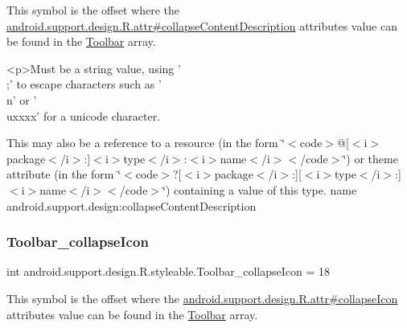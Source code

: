 This symbol is the offset where the \hyperlink{classandroid_1_1support_1_1design_1_1R_1_1attr_aa5754fb1f9395624cc050bbc138cd96d}{android.\+support.\+design.\+R.\+attr\#collapse\+Content\+Description} attribute\textquotesingle{}s value can be found in the \hyperlink{classandroid_1_1support_1_1design_1_1R_1_1styleable_a7783ebe780dbe2a845802a40519a46e9}{Toolbar} array.

\begin{DoxyVerb}      <p>Must be a string value, using '\\;' to escape characters such as '\\n' or '\\uxxxx' for a unicode character.
\end{DoxyVerb}
 

This may also be a reference to a resource (in the form \char`\"{}$<$code$>$@\mbox{[}$<$i$>$package$<$/i$>$\+:\mbox{]}$<$i$>$type$<$/i$>$\+:$<$i$>$name$<$/i$>$$<$/code$>$\char`\"{}) or theme attribute (in the form \char`\"{}$<$code$>$?\mbox{[}$<$i$>$package$<$/i$>$\+:\mbox{]}\mbox{[}$<$i$>$type$<$/i$>$\+:\mbox{]}$<$i$>$name$<$/i$>$$<$/code$>$\char`\"{}) containing a value of this type.  name android.\+support.\+design\+:collapse\+Content\+Description \mbox{\label{classandroid_1_1support_1_1design_1_1R_1_1styleable_ab8736925c114eaeba368273e6f851ae8}} 
\subsubsection{\texorpdfstring{Toolbar\+\_\+collapse\+Icon}{Toolbar\_collapseIcon}}
{\footnotesize\ttfamily int android.\+support.\+design.\+R.\+styleable.\+Toolbar\+\_\+collapse\+Icon = 18\hspace{0.3cm}{\ttfamily [static]}}

This symbol is the offset where the \hyperlink{classandroid_1_1support_1_1design_1_1R_1_1attr_ab780800888c8f742b7139b48235b7ff7}{android.\+support.\+design.\+R.\+attr\#collapse\+Icon} attribute\textquotesingle{}s value can be found in the \hyperlink{classandroid_1_1support_1_1design_1_1R_1_1styleable_a7783ebe780dbe2a845802a40519a46e9}{Toolbar} array.

